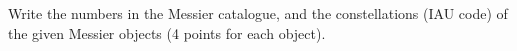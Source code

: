 Write the numbers in the Messier catalogue, and the constellations (IAU code)
of the given Messier objects (4 points for each object).

